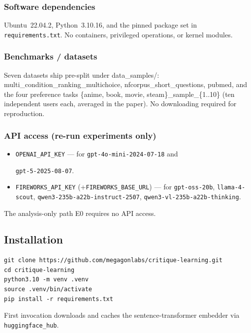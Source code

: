 \subsubsection{Software dependencies}
Ubuntu~22.04.2, Python~3.10.16, and the pinned package set in
\texttt{requirements.txt}. No containers, privileged
operations, or kernel modules.

\subsubsection{Benchmarks / datasets}
Seven datasets ship pre-split under data\_\allowbreak samples/:
multi\_\allowbreak condition\_\allowbreak ranking\_\allowbreak multichoice,
nfcorpus\_\allowbreak short\_\allowbreak questions, pubmed, and the four
preference tasks \{anime, book, movie, steam\}\_\allowbreak sample\_\allowbreak \{1..10\} (ten independent users each,
averaged in the paper). No downloading required for reproduction.

\subsubsection{API access (re-run experiments only)}
{\small
\begin{itemize}
  \item \texttt{OPENAI\_API\_KEY} --- for \texttt{gpt-4o-mini-2024-07-18} and  
  
        \texttt{gpt-5-2025-08-07}.
  \item \texttt{FIREWORKS\_API\_KEY} (+\texttt{FIREWORKS\_BASE\_URL}) ---
        for \texttt{gpt-oss-20b}, \texttt{llama-4-scout},
        \texttt{qwen3-235b-a22b-instruct-2507},
        \texttt{qwen3-vl-\allowbreak 235b-\allowbreak a22b-thinking}.
\end{itemize}
}
The analysis-only path E0 requires no API access.

\subsection{Installation}
{\small
\begin{verbatim}
git clone https://github.com/megagonlabs/critique-learning.git 
cd critique-learning
python3.10 -m venv .venv
source .venv/bin/activate
pip install -r requirements.txt
\end{verbatim}
}
First invocation downloads and caches the sentence-transformer embedder
via \texttt{huggingface\_hub}.


